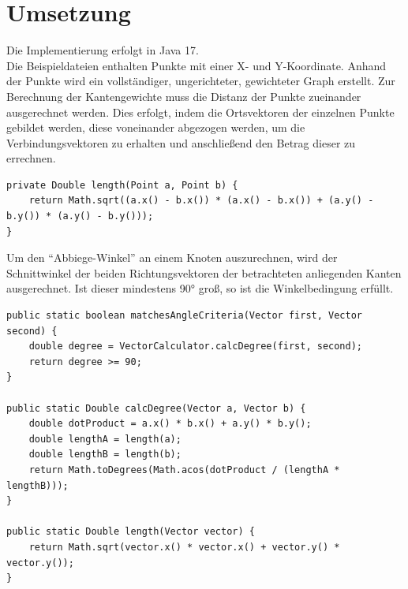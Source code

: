 \section{Umsetzung}\label{sec:umsetzung}
Die Implementierung erfolgt in Java 17. \\
Die Beispieldateien enthalten Punkte mit einer X- und Y-Koordinate.
Anhand der Punkte wird ein vollständiger, ungerichteter, gewichteter Graph erstellt.
Zur Berechnung der Kantengewichte muss die Distanz der Punkte zueinander ausgerechnet werden.
Dies erfolgt, indem die Ortsvektoren der einzelnen Punkte gebildet werden, diese voneinander abgezogen werden, um die
Verbindungsvektoren zu erhalten und anschlie{\ss}end den Betrag dieser zu errechnen.
\begin{lstlisting}[label={lst:distance}]
private Double length(Point a, Point b) {
    return Math.sqrt((a.x() - b.x()) * (a.x() - b.x()) + (a.y() - b.y()) * (a.y() - b.y()));
}
\end{lstlisting}
Um den ``Abbiege-Winkel'' an einem Knoten auszurechnen, wird der Schnittwinkel der beiden Richtungsvektoren der
betrachteten anliegenden Kanten ausgerechnet.
Ist dieser mindestens 90° gro{\ss}, so ist die Winkelbedingung erfüllt.
\begin{lstlisting}[label={lst:vector-calc}]
public static boolean matchesAngleCriteria(Vector first, Vector second) {
    double degree = VectorCalculator.calcDegree(first, second);
    return degree >= 90;
}

public static Double calcDegree(Vector a, Vector b) {
    double dotProduct = a.x() * b.x() + a.y() * b.y();
    double lengthA = length(a);
    double lengthB = length(b);
    return Math.toDegrees(Math.acos(dotProduct / (lengthA * lengthB)));
}

public static Double length(Vector vector) {
    return Math.sqrt(vector.x() * vector.x() + vector.y() * vector.y());
}
\end{lstlisting}

